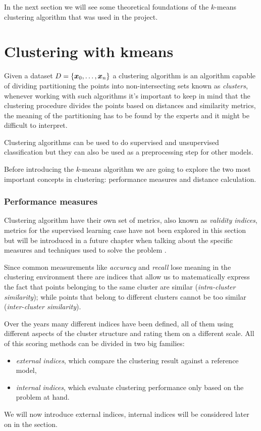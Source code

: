 In the next section we will see some theoretical foundations of the $k$-means clustering algorithm
that was used in the project.
 
\section{Clustering with k\-means}
\label{sec:kmeans}
Given a dataset $D = \{\boldsymbol{x}_0, \ldots, \boldsymbol{x}_n\}$ a clustering algorithm is an algorithm capable of dividing partitioning the
points into non-intersecting sets known as \emph{clusters}, whenever working with such algorithms
it's important to keep in mind that the clustering procedure divides the points based on distances
and similarity metrics, the meaning of the partitioning has to be found by the experts and it might
be difficult to interpret.

\medskip

Clustering algorithms can be used to do supervised and unsupervised classification but they can also
be used as a preprocessing step for other models.

\medskip

Before introducing the $k$-means algorithm we are going to explore the two most important concepts
in clustering: performance measures and distance calculation.

\subsubsection{Performance measures}
\label{ssec:performance-measures}
Clustering algorithm have their own set of metrics, also known as \emph{validity indices}, metrics
for the supervised learning case have not been explored in this section but will be introduced in a
future chapter when talking about the specific measures and techniques used to solve the problem
.

\medskip

Since common measurements like \emph{accuracy} and \emph{recall} lose meaning in the clustering
environment there are indices that allow us to matematically express the fact that points belonging
to the same cluster are similar (\emph{intra-cluster similarity}); while points that belong to
different clusters cannot be too similar (\emph{inter-cluster similarity}).

\medskip

Over the years many different indices have been defined, all of them using different aspects of the
cluster structure and rating them on a different scale. All of this scoring methods can be divided
in two big families:
\begin{itemize}
	\item \emph{external indices}, which compare the clustering result against a reference model,
	\item \emph{internal indices}, which evaluate clustering performance only based on the
		problem at hand.
\end{itemize}
We will now introduce external indices, internal indices will be considered later on in the section.

